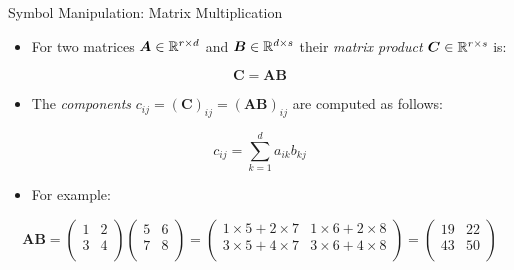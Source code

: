 \documentclass[mathserif, aspectratio=169]{beamer}
\begin{document}
\begin{frame}{Symbol Manipulation: Matrix Multiplication}
	\begin{itemize}
		\item For two matrices $\bm{A} \in \mathbb{R}^{r\times d}$ and $\bm{B} \in \mathbb{R}^{d\times s}$ their \emph{matrix product}
			$\bm{C} \in \mathbb{R}^{r\times s}$ is:
	\end{itemize}
	\vspace{-12mm}
	\begin{center}
		\[ \bm{C} = \bm{AB} \]
	\end{center}
	\begin{itemize}
		\item The \emph{components} $c_{ij} = (\bm{C})_{ij} = (\bm{AB})_{ij}$ are computed as follows: 
	\end{itemize}
	\vspace{-12mm}
	\begin{center}
		\[ c_{ij} = \sum_{k = 1}^{d} a_{ik}b_{kj} \]
	\end{center}
	\vspace{-5mm}
	\begin{itemize}
		\item For example:
	\end{itemize}
	\vspace{-12mm}
	\begin{center}
		\[
			\bm{AB} =
			\begin{pmatrix}
				1 & 2 \\ 3 & 4 \\
			\end{pmatrix}
			\begin{pmatrix}
				5 & 6 \\ 7 & 8 \\
			\end{pmatrix}
			=
			\begin{pmatrix}
				1\times 5 + 2\times 7 & 1\times 6 + 2\times 8\\ 
				3\times 5 + 4\times 7 & 3\times 6 + 4\times 8 \\
			\end{pmatrix}
			=
			\begin{pmatrix}
				19 & 22 \\ 43 & 50 \\
			\end{pmatrix}
		\]
	\end{center}
\end{frame}
\end{document}
